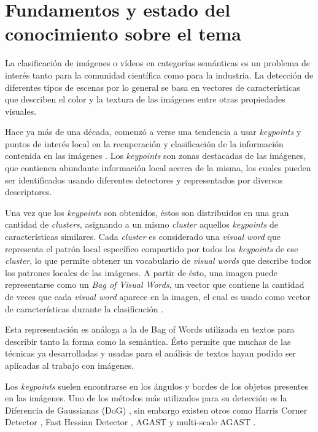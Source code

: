 \section{Fundamentos y estado del conocimiento sobre el tema} \label{fundyestarte}
\iffalse
Escriba una breve introducción general al tema y cite y comente las mayores
contribuciones en el tema específico, incluyendo bibliografıa actualizada.
\fi
La clasificación de imágenes o vídeos en categorías semánticas es un problema de interés tanto para la comunidad científica como
para la industria. La detección de diferentes tipos de escenas por lo general se basa en vectores de características que describen
el color y la textura de las imágenes entre otras propiedades visuales.

Hace ya más de una década, comenzó a verse una tendencia a usar \textit{keypoints} y puntos de interés local en la recuperación y
clasificación de la información contenida en las imágenes \parencite{csurka2004visual, lopes2010action}. Los \textit{keypoints} son zonas destacadas
de las imágenes, que contienen abundante información local acerca de la misma, los cuales pueden ser identificados usando diferentes detectores y representados
por diversos descriptores.

Una vez que los \textit{keypoints} son obtenidos, éstos son distribuidos en una gran cantidad de \textit{clusters}, asignando a un mismo
\textit{cluster} aquellos \textit{keypoints} de características similares. Cada \textit{cluster} es considerado una \textit{visual word}
que representa el patrón local específico compartido por todos los \textit{keypoints} de ese \textit{cluster}, lo que permite obtener un
vocabulario de \textit{visual words} que describe todos los patrones locales de las imágenes. A partir
de ésto, una imagen puede representarse como un \textit{Bag of Visual Words}, un vector que contiene
la cantidad de veces que cada \textit{visual word} aparece en la imagen, el cual es usado como vector
de características durante la clasificación \parencite{yang2007evaluating}.

Esta representación es análoga a la de Bag of Words utilizada en textos para describir tanto la forma
como la semántica. Ésto permite que muchas de las técnicas ya desarrolladas y usadas para el análisis de textos hayan podido ser aplicadas
al trabajo con imágenes.

Los \textit{keypoints} suelen encontrarse en los ángulos y bordes de los objetos presentes en las imágenes.
Uno de los métodos más utilizados para su detección es la Diferencia de Gaussianas (DoG) \parencite{lowe2004distinctive}, sin embargo existen otros como
Harris Corner Detector \parencite{harris1988combined}, Fast Hessian Detector \parencite{bay2006surf}, AGAST \parencite{mair2010adaptive} y
multi-scale AGAST \parencite{leutenegger2011brisk}. 

